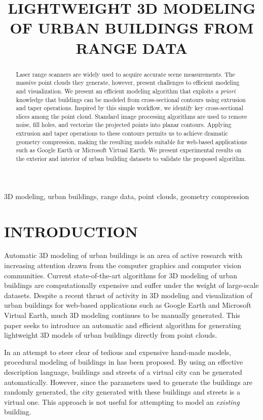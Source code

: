 \documentclass{article}
\title{LIGHTWEIGHT 3D MODELING OF URBAN BUILDINGS FROM RANGE DATA}
\begin{document}
%
\maketitle
%
\begin{abstract}
Laser range scanners are widely used to acquire accurate scene measurements.
The massive point clouds they generate, however, present challenges to
efficient modeling and visualization.
We present an efficient modeling algorithm that exploits \emph{a priori}
knowledge that buildings can be modeled from cross-sectional contours
using extrusion and taper operations.
Inspired by this simple workflow, we identify key cross-sectional slices among
the point cloud.
Standard image processing algorithms are used to remove noise, fill holes,
and vectorize the projected points into planar contours.
Applying extrusion and taper operations to these contours
permits us to achieve dramatic geometry compression, making the resulting
models suitable for web-based applications such as Google Earth
or Microsoft Virtual Earth.
We present experimental results on the exterior and interior of urban building
datasets to validate the proposed algorithm.
\end{abstract}
%
\begin{keywords}
3D modeling, urban buildings, range data, point clouds, geometry compression
\end{keywords}
%
\section{INTRODUCTION}
\label{sec:intro}

Automatic 3D modeling of urban buildings is an area of active research
with increasing attention drawn from the computer graphics and
computer vision communities.
Current state-of-the-art algorithms for 3D modeling of urban buildings are
computationally expensive and suffer under the weight of large-scale datasets.
Despite a recent thrust of activity in 3D modeling and visualization of
urban buildings for web-based applications such as Google Earth and Microsoft
Virtual Earth, much 3D modeling continues to be manually generated.
This paper seeks to introduce an automatic and efficient algorithm for
generating lightweight 3D models of urban buildings directly from point clouds.

In an attempt to steer clear of tedious and expensive hand-made models,
procedural modeling of buildings in \cite{PMB_MWH,PMB_WWS} has been proposed.
By using an effective description language, buildings and streets of a virtual
city can be generated automatically.
However, since the parameters used to generate the buildings are randomly
generated, the city generated with these buildings and streets is a virtual one.
This approach is not useful for attempting to model an {\it existing} building.
\end{document}
